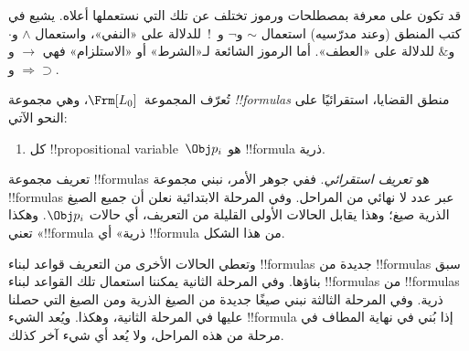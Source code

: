 \documentclass[../../../include/open-logic-section]{subfiles}
\begin{document}
\begin{intro}
قد تكون على معرفة بمصطلحات ورموز تختلف عن تلك التي نستعملها أعلاه. يشيع
في كتب المنطق (وعند مدرّسيه) استعمال $\sim$ و$\neg$ و~!\ للدلالة على
«النفي»، واستعمال $\wedge$ و$\cdot$ و$\&$ للدلالة على «العطف». أما
الرموز الشائعة لـ«الشرط» أو «الاستلزام» فهي $\rightarrow$
و$\Rightarrow$ و$\supset$.
\end{intro}

\begin{defn}[الصيغة]
تُعرّف المجموعة~$\Frm[L_0]$، وهي مجموعة \emph{!!{formula}s} منطق
القضايا، استقرائيًا على النحو الآتي:
\begin{enumerate}


\item كل !!{propositional variable}~$\Obj p_i$ هو !!{formula}
  ذرية.






\end{enumerate}
\end{defn}

\begin{explain}
تعريف مجموعة !!{formula}s هو \emph{تعريف استقرائي}. ففي جوهر الأمر،
نبني مجموعة
!!{formula}s عبر عدد لا نهائي من المراحل. وفي المرحلة الابتدائية نعلن
أن جميع الصيغ الذرية صيغ؛ وهذا يقابل الحالات الأولى القليلة من
التعريف، أي حالات
%
%
$\Obj p_i$. وهكذا تعني «!!{formula} ذرية» أي !!{formula} من هذا
الشكل.

وتعطي الحالات الأخرى من التعريف قواعد لبناء !!{formula}s جديدة من
!!{formula}s سبق بناؤها. وفي المرحلة الثانية يمكننا استعمال تلك
القواعد لبناء !!{formula}s من !!{formula}s ذرية. وفي المرحلة الثالثة
نبني صيغًا جديدة من الصيغ الذرية ومن الصيغ التي حصلنا عليها في
المرحلة الثانية، وهكذا. ويُعد الشيء !!{formula} إذا بُني في نهاية
المطاف في مرحلة من هذه المراحل، ولا يُعد أي شيء آخر كذلك.
\end{explain}
\end{document}
